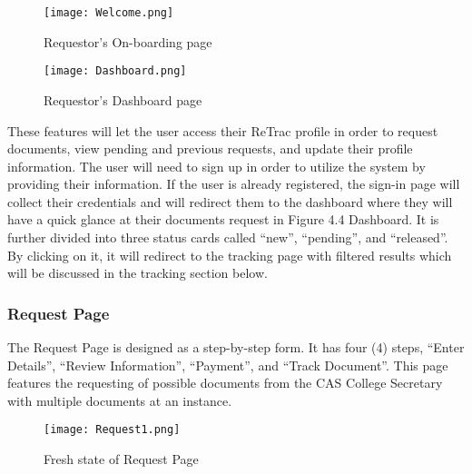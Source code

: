     \begin{figure}[h]
        \centering 
        \begin{minipage}[c]{0.5\linewidth}
            \centering
            \texttt{[image: Welcome.png]}
            \caption{Requestor's On-boarding page}
            \label{fig:Welcome}
        \end{minipage}
    \end{figure}

    \begin{figure}[h]
        \centering 
        \begin{minipage}[c]{0.5\linewidth}
            \centering
            \texttt{[image: Dashboard.png]}
            \caption{Requestor's Dashboard page}
            \label{fig:Dashboard}
        \end{minipage}
    \end{figure}


These features will let the user access their ReTrac profile in order to request documents, view pending and previous requests, and update their profile information. The user will need to sign up in order to utilize the system by providing their information. If the user is already registered, the sign-in page will collect their credentials and will redirect them to the dashboard where they will have a quick glance at their documents request in Figure 4.4 Dashboard. It is further divided into three status cards called “new”, “pending”, and “released”. By clicking on it, it will redirect to the tracking page with filtered results which will be discussed in the tracking section below.

\subsubsection{Request Page}

The Request Page is designed as a step-by-step form. It has four (4) steps, “Enter Details”, “Review Information”, “Payment”, and “Track Document”. This page features the requesting of possible documents from the CAS College Secretary with multiple documents at an instance.

    \begin{figure}[h]
        \centering 
        \begin{minipage}[c]{0.5\linewidth}
            \centering
            \texttt{[image: Request1.png]}
            \caption{Fresh state of Request Page}
            \label{fig:Request1}
        \end{minipage}
    \end{figure}


